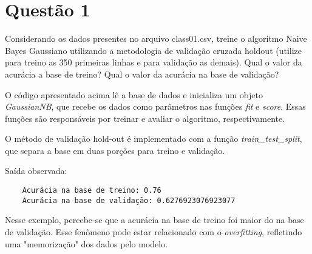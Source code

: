 \section{Questão 1}

Considerando os dados presentes no arquivo class01.csv, treine o algoritmo Naive Bayes Gaussiano utilizando a metodologia de validação cruzada holdout (utilize para treino as 350 primeiras linhas e para validação as demais). Qual o valor da acurácia a base de treino? Qual o valor da acurácia na base de validação?



O código apresentado acima lê a base de dados e inicializa um objeto \emph{GaussianNB}, que recebe os dados como parâmetros nas funções \emph{fit} e \emph{score}. Essas funções são responsáveis por treinar e avaliar o algoritmo, respectivamente.

O método de validação hold-out é implementado com a função \emph{train\_test\_split}, que separa a base em duas porções para treino e validação.

Saída observada:

\begin{lstlisting}
    Acurácia na base de treino: 0.76
    Acurácia na base de validação: 0.6276923076923077
\end{lstlisting}

Nesse exemplo, percebe-se que a acurácia na base de treino foi maior do na base de validação. Esse fenômeno pode estar relacionado com o \emph{overfitting}, refletindo uma "memorização" dos dados pelo modelo.